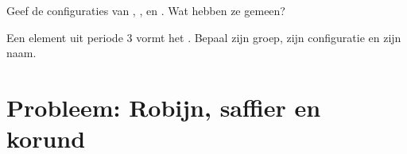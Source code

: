 \begin{exercise}[$\star\star\star$]\label{exo:g10:electron-shells:14}
Geef de configuraties van , ,  en
. Wat hebben ze gemeen?
\end{exercise}

\begin{exercise}[$\star\star\star$]\label{exo:g10:electron-shells:15}
Een element uit periode 3 vormt het  . Bepaal zijn groep,
zijn configuratie en zijn naam.
\end{exercise}

\section{Probleem: Robijn, saffier en korund}

